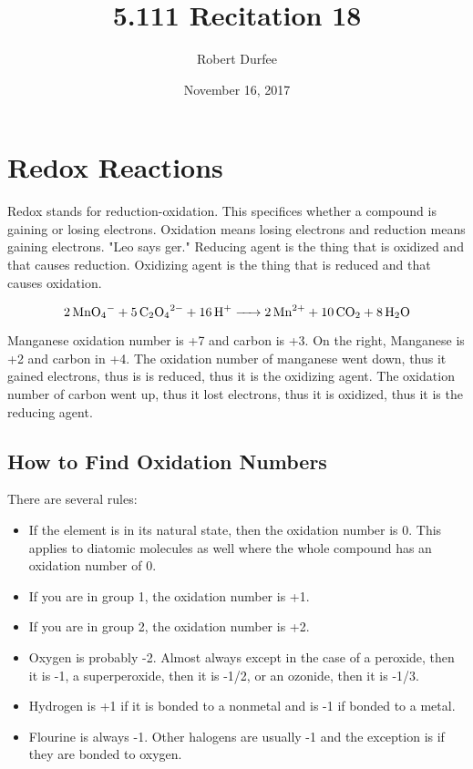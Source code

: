 \documentclass{article}
\title{ 5.111 Recitation 18 }
\author{ Robert Durfee }
\date{ November 16, 2017 }
\begin{document}
\maketitle

\section{ Redox Reactions }

Redox stands for reduction-oxidation. This specifices whether a compound is
gaining or losing electrons. Oxidation means losing electrons and reduction
means gaining electrons. "Leo says ger." Reducing agent is the thing that is
oxidized and that causes reduction. Oxidizing agent is the thing that is reduced
and that causes oxidation.

$$\ce{2MnO_4^- + 5 C_2O_4^{2-} + 16H+ -> 2Mn^{2+} + 10CO_2 + 8H_2O}$$

Manganese oxidation number is +7 and carbon is +3. On the right, Manganese is +2
and carbon in +4. The oxidation number of manganese went down, thus it gained
electrons, thus is is reduced, thus it is the oxidizing agent. The oxidation
number of carbon went up, thus it lost electrons, thus it is oxidized, thus it
is the reducing agent.

\subsection{ How to Find Oxidation Numbers}

There are several rules:

\begin{itemize}
    \item If the element is in its natural state, then the oxidation number is
        0. This applies to diatomic molecules as well where the whole
        compound has an oxidation number of 0.
    \item If you are in group 1, the oxidation number is +1.
    \item If you are in group 2, the oxidation number is +2.
    \item Oxygen is probably -2. Almost always except in the case of a
        peroxide, then it is -1, a superperoxide, then it is -1/2, or an
        ozonide, then it is -1/3.
    \item Hydrogen is +1 if it is bonded to a nonmetal and is -1 if bonded to a
        metal.
    \item Flourine is always -1. Other halogens are usually -1 and the exception is if they are bonded
        to oxygen.
\end{itemize}
\end{document}
